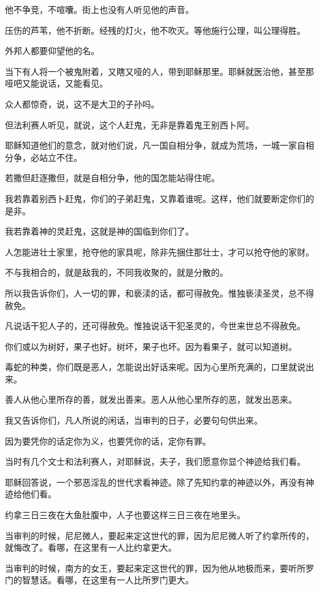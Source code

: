 \documentclass[12pt,oneside]{book}
\begin{document}
他不争竞，不喧囔。街上也没有人听见他的声音。

压伤的芦苇，他不折断。经残的灯火，他不吹灭。等他施行公理，叫公理得胜。

外邦人都要仰望他的名。

当下有人将一个被鬼附着，又瞎又哑的人，带到耶稣那里。耶稣就医治他，甚至那哑吧又能说话，又能看见。

众人都惊奇，说，这不是大卫的子孙吗。

但法利赛人听见，就说，这个人赶鬼，无非是靠着鬼王别西卜阿。

耶稣知道他们的意念，就对他们说，凡一国自相分争，就成为荒场，一城一家自相分争，必站立不住。

若撒但赶逐撒但，就是自相分争，他的国怎能站得住呢。

我若靠着别西卜赶鬼，你们的子弟赶鬼，又靠着谁呢。这样，他们就要断定你们的是非。

我若靠着神的灵赶鬼，这就是神的国临到你们了。

人怎能进壮士家里，抢夺他的家具呢，除非先捆住那壮士，才可以抢夺他的家财。

不与我相合的，就是敌我的，不同我收聚的，就是分散的。

所以我告诉你们，人一切的罪，和亵渎的话，都可得赦免。惟独亵渎圣灵，总不得赦免。

凡说话干犯人子的，还可得赦免。惟独说话干犯圣灵的，今世来世总不得赦免。

你们或以为树好，果子也好。树坏，果子也坏。因为看果子，就可以知道树。

毒蛇的种类，你们既是恶人，怎能说出好话来呢。因为心里所充满的，口里就说出来。

善人从他心里所存的善，就发出善来。恶人从他心里所存的恶，就发出恶来。

我又告诉你们，凡人所说的闲话，当审判的日子，必要句句供出来。

因为要凭你的话定你为义，也要凭你的话，定你有罪。

当时有几个文士和法利赛人，对耶稣说，夫子，我们愿意你显个神迹给我们看。

耶稣回答说，一个邪恶淫乱的世代求看神迹。除了先知约拿的神迹以外，再没有神迹给他们看。

约拿三日三夜在大鱼肚腹中，人子也要这样三日三夜在地里头。

当审判的时候，尼尼微人，要起来定这世代的罪，因为尼尼微人听了约拿所传的，就悔改了。看哪，在这里有一人比约拿更大。

当审判的时候，南方的女王，要起来定这世代的罪，因为他从地极而来，要听所罗门的智慧话。看哪，在这里有一人比所罗门更大。
\end{document}
